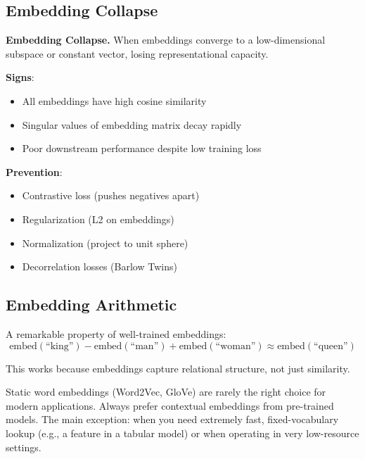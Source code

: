 \subsection{Embedding Collapse}

\textbf{Embedding Collapse.} When embeddings converge to a low-dimensional subspace or constant vector, losing representational capacity.

\textbf{Signs}:
\begin{itemize}
    \item All embeddings have high cosine similarity
    \item Singular values of embedding matrix decay rapidly
    \item Poor downstream performance despite low training loss
\end{itemize}

\textbf{Prevention}:
\begin{itemize}
    \item Contrastive loss (pushes negatives apart)
    \item Regularization (L2 on embeddings)
    \item Normalization (project to unit sphere)
    \item Decorrelation losses (Barlow Twins)
\end{itemize}

\subsection{Embedding Arithmetic}

A remarkable property of well-trained embeddings:
\begin{equation}
\text{embed}(\text{``king''}) - \text{embed}(\text{``man''}) + \text{embed}(\text{``woman''}) \approx \text{embed}(\text{``queen''})
\end{equation}

This works because embeddings capture relational structure, not just similarity.

\begin{warningbox}
Static word embeddings (Word2Vec, GloVe) are rarely the right choice for modern applications. Always prefer contextual embeddings from pre-trained models. The main exception: when you need extremely fast, fixed-vocabulary lookup (e.g., a feature in a tabular model) or when operating in very low-resource settings.
\end{warningbox}


